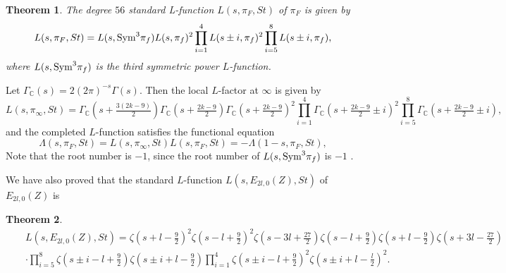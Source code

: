 \documentclass[11pt]{amsart}
\numberwithin{equation}{section}
\newtheorem{theorem}{Theorem}[section]
\theoremstyle{definition}
\begin{document}
\begin{theorem} The degree $56$ standard L-function $L(s,\pi_F,St)$ of $\pi_F$ is given by
$$L(s,\pi_F,St)=L(s,{\rm Sym}^3 \pi_f)L(s,\pi_f)^2 \prod_{i=1}^4 L(s\pm i,\pi_f)^2 \prod_{i=5}^8 L(s\pm i,\pi_f),
$$
where $L(s,{\rm Sym}^3 \pi_f)$ is the third symmetric power $L$-function.
\end{theorem}
Let $\Gamma_{\mathbb{C}}(s)=2(2\pi)^{-s}\Gamma(s)$.
Then the local $L$-factor at $\infty$ is given by
$$L(s,\pi_\infty,St)=\Gamma_{\mathbb{C}}(s+\tfrac {3(2k-9)}2)\Gamma_{\mathbb{C}}(s+\tfrac {2k-9}2) \Gamma_{\mathbb{C}}(s+\tfrac {2k-9}2)^2 
\prod_{i=1}^4 \Gamma_{\mathbb{C}}(s+\tfrac {2k-9}2\pm i)^2 \prod_{i=5}^8 \Gamma_{\mathbb{C}}(s+\tfrac {2k-9}2\pm i),
$$
and the completed $L$-function satisfies the functional equation
$$\Lambda(s,\pi_F,St)=L(s,\pi_\infty,St)L(s,\pi_F,St)=- \Lambda(1-s,\pi_F,St),
$$
Note that the root number is $-1$, since the root number of $L(s, {\rm Sym}^3 \pi_f)$ is $-1$ \cite{CM}.

We have also proved that the standard $L$-function $L(s,E_{2l,0}(Z),St)$ of $E_{2l,0}(Z)$ is 
\begin{theorem}
\begin{eqnarray*} 
&& L(s,E_{2l,0}(Z),St)=\zeta(s+l-\tfrac {9}2)^2 \zeta(s-l+\tfrac {9}2)^2 \zeta(s-3l+\tfrac {27}2) \zeta(s-l+\tfrac {9}2) \zeta(s+l-\tfrac {9}2)
\zeta(s+3l-\tfrac {27}2) \\
&&\cdot \prod_{i=5}^8 \zeta(s\pm i-l+\tfrac {9}2) \zeta(s\pm i +l-\tfrac {9}2) \prod_{i=1}^4 \zeta(s\pm i-l+\tfrac {9}2)^2 \zeta(s\pm i+l-\tfrac {l}2)^2.
\end{eqnarray*}
\end{theorem}
\end{document}

